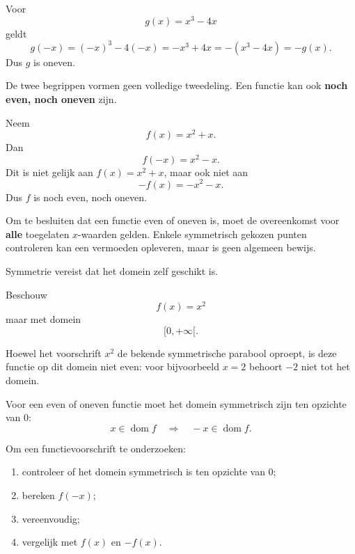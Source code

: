 \documentclass{ximera}
\begin{document}
\begin{voorbeeld}
Voor
\[
g(x)=x^3-4x
\]
geldt
\[
g(-x)=(-x)^3-4(-x)=-x^3+4x=-(x^3-4x)=-g(x).
\]
Dus \(g\) is oneven.
\end{voorbeeld}


De twee begrippen vormen geen volledige tweedeling.
Een functie kan ook \textbf{noch even, noch oneven} zijn.

\begin{voorbeeld}
Neem
\[
f(x)=x^2+x.
\]
Dan
\[
f(-x)=x^2-x.
\]
Dit is niet gelijk aan \(f(x)=x^2+x\), maar ook niet aan
\[
-f(x)=-x^2-x.
\]
Dus \(f\) is noch even, noch oneven.
\end{voorbeeld}

\begin{opmerking}
Om te besluiten dat een functie even of oneven is, moet de overeenkomst voor
\textbf{alle} toegelaten \(x\)-waarden gelden. Enkele symmetrisch gekozen punten
controleren kan een vermoeden opleveren, maar is geen algemeen bewijs.
\end{opmerking}


Symmetrie vereist dat het domein zelf geschikt is.

Beschouw
\[
f(x)=x^2
\]
maar met domein
\[
[0,+\infty[.
\]

Hoewel het voorschrift \(x^2\) de bekende symmetrische parabool oproept,
is deze functie op dit domein niet even: voor bijvoorbeeld \(x=2\) behoort
\(-2\) niet tot het domein.

\begin{eigenschap}
Voor een even of oneven functie moet het domein symmetrisch zijn ten opzichte
van \(0\):
\[
x\in\operatorname{dom}f
\quad\Longrightarrow\quad
-x\in\operatorname{dom}f.
\]
\end{eigenschap}


Om een functievoorschrift te onderzoeken:

\begin{enumerate}
  \item controleer of het domein symmetrisch is ten opzichte van \(0\);
  \item bereken \(f(-x)\);
  \item vereenvoudig;
  \item vergelijk met \(f(x)\) en \(-f(x)\).
\end{enumerate}
\end{document}
